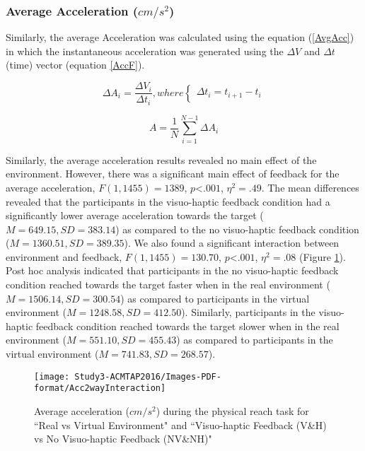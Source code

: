 \subsubsection{Average Acceleration ($cm/s^2$)}
Similarly, the average Acceleration was calculated using the equation (\ref{AvgAcc}) in which the instantaneous acceleration was generated using the $\Delta V$ and $\Delta t$ (time) vector (equation \ref{AccF}).


\begin{equation} \label{AccF}
\Delta A_i = \frac{\Delta V_i}{\Delta t_i}, where
\begin{cases}
\Delta t_i = t_{i+1}-t_{i}
\end{cases}
\end{equation}

\begin{equation} \label{AvgAcc}
A = \frac{1}{N}\sum_{i=1}^{N-1}\Delta A_i 
\end{equation}

Similarly, the average acceleration results revealed no main effect of the environment. However, there was a significant main effect of feedback for the average acceleration, $F(1,1455)=1389$, $p$\textless$.001$, $\eta^{2}=.49$. The mean differences revealed that the participants in the visuo-haptic feedback condition had a significantly lower average acceleration towards the target ($M=649.15, SD=383.14$) as compared to the no visuo-haptic feedback condition ($M=1360.51, SD=389.35$). We also found a significant interaction between environment and feedback, $F(1,1455)=130.70$, $p$\textless$.001$, $\eta^{2}=.08$ (Figure \ref{fig:avgAcc2way}). Post hoc analysis indicated that participants in the no visuo-haptic feedback condition reached towards the target faster when in the real environment ($M=1506.14, SD=300.54$) as compared to participants in the virtual environment ($M=1248.58, SD=412.50$). Similarly, participants in the visuo-haptic feedback condition reached towards the target slower when in the real environment ($M=551.10, SD=455.43$) as compared to participants in the virtual environment ($M=741.83, SD=268.57$). 


\begin{figure}
	\centering
	\texttt{[image: Study3-ACMTAP2016/Images-PDF-format/Acc2wayInteraction]}
	\caption{\textsf{Average acceleration ($cm/s^{2}$) during the physical reach task for ``Real vs Virtual Environment" and ``Visuo-haptic Feedback (V\&H) vs No Visuo-haptic Feedback (NV\&NH)"}}
	\label{fig:avgAcc2way}
\end{figure}


